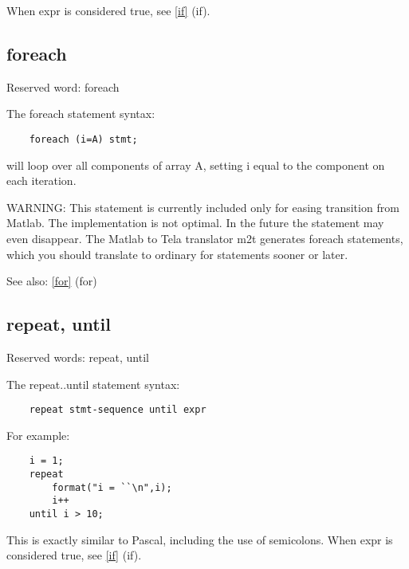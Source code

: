\documentclass[a4paper]{article}
\begin{document}
When expr is considered true, see \ref{if} {(if)}.




\subsection{foreach\label{foreach}}

Reserved word: foreach

The foreach statement syntax:

\begin{tscreen}
\begin{verbatim}
    foreach (i=A) stmt;
\end{verbatim}
\end{tscreen}

will loop over all components of array A, setting i equal to the component
on each iteration.

WARNING: This statement is currently included only for easing transition
from Matlab. The implementation is not optimal. In the future the statement
may even disappear. The Matlab to Tela translator m2t generates foreach
statements, which you should translate to ordinary for statements sooner
or later.

See also: \ref{for} {(for)}




\subsection{repeat, until\label{repeat}}

Reserved words: repeat, until

The repeat..until statement syntax:

\begin{tscreen}
\begin{verbatim}
    repeat stmt-sequence until expr
\end{verbatim}
\end{tscreen}


For example:

\begin{tscreen}
\begin{verbatim}
    i = 1;
    repeat
        format("i = ``\n",i);
        i++
    until i > 10;
\end{verbatim}
\end{tscreen}


This is exactly similar to Pascal, including the use of semicolons.
When expr is considered true, see \ref{if} {(if)}.
\end{document}
